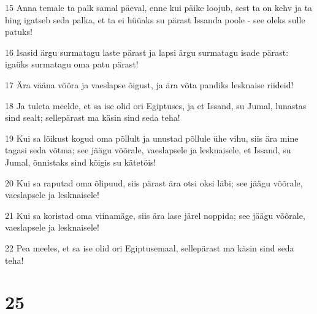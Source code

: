 \par 15 Anna temale ta palk samal päeval, enne kui päike loojub, sest ta on kehv ja ta hing igatseb seda palka, et ta ei hüüaks su pärast Issanda poole - see oleks sulle patuks!
\par 16 Isasid ärgu surmatagu laste pärast ja lapsi ärgu surmatagu isade pärast: igaüks surmatagu oma patu pärast!
\par 17 Ära vääna võõra ja vaeslapse õigust, ja ära võta pandiks lesknaise riideid!
\par 18 Ja tuleta meelde, et sa ise olid ori Egiptuses, ja et Issand, su Jumal, lunastas sind sealt; sellepärast ma käsin sind seda teha!
\par 19 Kui sa lõikust kogud oma põllult ja unustad põllule ühe vihu, siis ära mine tagasi seda võtma; see jäägu võõrale, vaeslapsele ja lesknaisele, et Issand, su Jumal, õnnistaks sind kõigis su kätetöis!
\par 20 Kui sa raputad oma õlipuud, siis pärast ära otsi oksi läbi; see jäägu võõrale, vaeslapsele ja lesknaisele!
\par 21 Kui sa koristad oma viinamäge, siis ära lase järel noppida; see jäägu võõrale, vaeslapsele ja lesknaisele!
\par 22 Pea meeles, et sa ise olid ori Egiptusemaal, sellepärast ma käsin sind seda teha!

\chapter{25}

